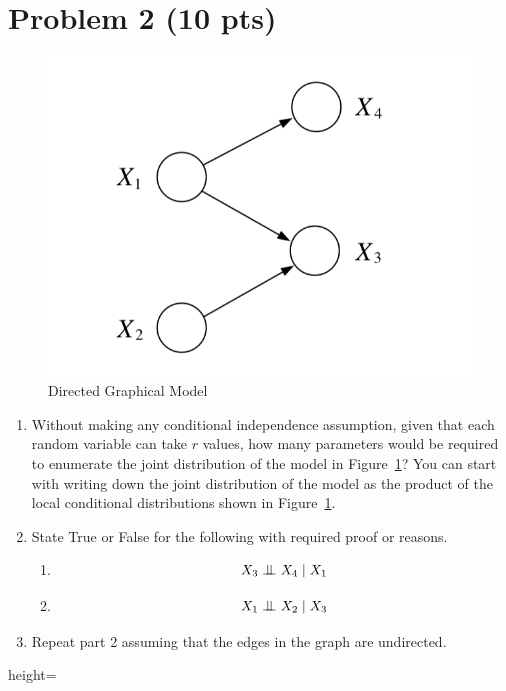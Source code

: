 \section*{Problem 2 (10 pts)}

\newcommand{\bigCI}{\mathrel{\text{\scalebox{1.07}{$\perp\mkern-10mu\perp$}}}}
\begin{figure}[h]
    \centering
    \includegraphics[scale=0.5]{images/written_2.png}
    \caption{Directed Graphical Model}
    \label{fig:my_label}
\end{figure}

\begin{enumerate}
    \item Without making any conditional independence assumption, given that each random variable can take $r$ values, how many parameters would be required to enumerate the joint distribution of the model in Figure~\ref{fig:my_label}? 
    You can start with writing down the joint distribution of the model as the product of the local conditional distributions shown in Figure~\ref{fig:my_label}. 

    \item State True or False for the following with required proof or reasons. 
    \begin{enumerate}
        \item \[  X_3 \bigCI X_4 \mid X_1 \]  
        \item \[  X_1 \bigCI X_2 \mid X_3 \] 
    \end{enumerate}
    
    \item Repeat part 2 assuming that the edges in the graph are undirected.
\end{enumerate}

\pagebreak

\begin{soln}{height=\textheight}
\end{soln}